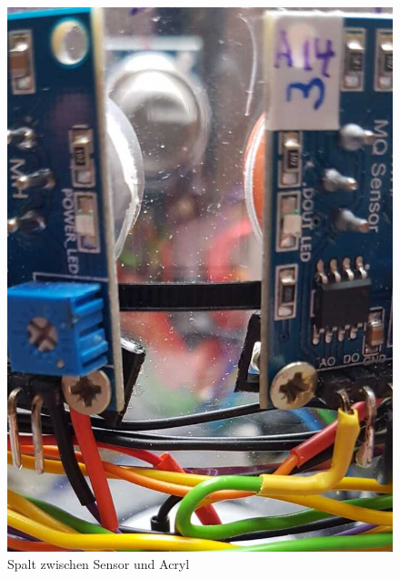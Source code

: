 \documentclass[10pt]{article}
\begin{document}
\begin{figure}[H]
\centering
\includegraphics[scale=0.20]{Bilder/Luecken.jpeg}
\caption{Spalt zwischen Sensor und Acryl}
\label{Luecken}
\end{figure} 
\end{document}
